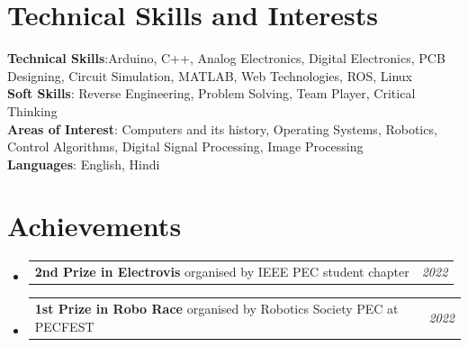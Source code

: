 \documentclass[a4paper,11pt]{article}
\makeatletter
\newcommand{\resumePOR}[3]{
\vspace{0.5mm}\item
    \begin{tabular*}{0.97\textwidth}[t]{l@{\extracolsep{\fill}}r}
        \textbf{#1}\hspace{0.3mm}#2 & \textit{\small{#3}} 
    \end{tabular*}
    \vspace{-2mm}
}
\newcommand{\resumeSubHeadingListStart}{\begin{itemize}[leftmargin=*,labelsep=0mm]}
\newcommand{\resumeSubHeadingListEnd}{\end{itemize}\vspace{2mm}}
\makeatother
\begin{document}
\section{\textbf{Technical Skills and Interests}}
\begin{itemize}[leftmargin=0.05in, label={}]
  \small{\item{
        \textbf{Technical Skills}{:Arduino, C++, Analog Electronics, Digital Electronics, PCB Designing, Circuit Simulation, MATLAB, Web Technologies, ROS, Linux} \\
        \textbf{Soft Skills}{: Reverse Engineering, Problem Solving, Team Player, Critical Thinking} \\
        \textbf{Areas of Interest}{: Computers and its history, Operating Systems, Robotics, Control Algorithms, Digital Signal Processing, Image Processing} \\
        \textbf{Languages}{: English, Hindi}\\
        }}
\end{itemize}
\vspace{-16pt}

\section{\textbf{Achievements}}
\vspace{-0.4mm}
\resumeSubHeadingListStart
\resumePOR{2nd Prize in Electrovis} %
{ organised by IEEE PEC student chapter} %
{2022} %

\resumePOR{1st Prize in Robo Race } %
{organised by Robotics Society PEC at PECFEST} %
{2022} %
\resumeSubHeadingListEnd
\vspace{-5mm}

\end{document}
